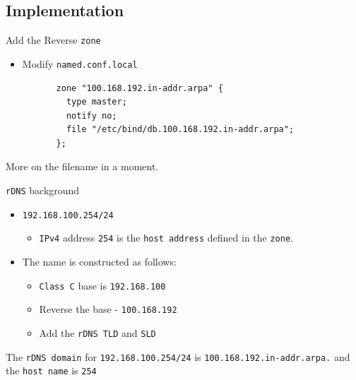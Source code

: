 \documentclass[xcolor=table,aspectratio=169]{beamer}
\begin{document}
\subsection{Implementation}
\begin{frame}[fragile]{Add the Reverse \texttt{zone}}
  \begin{itemize}
    \item Modify \texttt{named.conf.local}
  \end{itemize}
  \begin{tcolorbox}
    \lstset{
      basicstyle=\tiny\ttfamily,
    }
    \begin{lstlisting}
          zone "100.168.192.in-addr.arpa" {
            type master;
            notify no;
            file "/etc/bind/db.100.168.192.in-addr.arpa";
          };
    \end{lstlisting}
  \end{tcolorbox}
  \begin{tcolorbox}[title={\textbf{NOTE:}}]
    \begin{center}
      \scriptsize More on the filename in a moment.
    \end{center}
  \end{tcolorbox}
\end{frame}

\begin{frame}{\texttt{rDNS} background}
  \begin{itemize}
    \item \texttt{192.168.100.254/24} 
      \begin{itemize}
        \item \texttt{IPv4} address \texttt{254} is the \texttt{host address} defined in the \texttt{zone}.
      \end{itemize}
    \item The name is constructed as follows:
      \begin{itemize}
        \item \texttt{Class C}  base is \texttt{192.168.100}
        \item Reverse the base - \texttt{100.168.192}
        \item Add the \texttt{rDNS TLD} and \texttt{SLD}
      \end{itemize}
  \end{itemize}
  \begin{tcolorbox}
    \begin{center}
      The \texttt{rDNS domain} for \texttt{192.168.100.254/24} is \texttt{100.168.192.in-addr.arpa.} and the \texttt{host name} is \texttt{254}       
    \end{center}
  \end{tcolorbox}
\end{frame}
\end{document}
